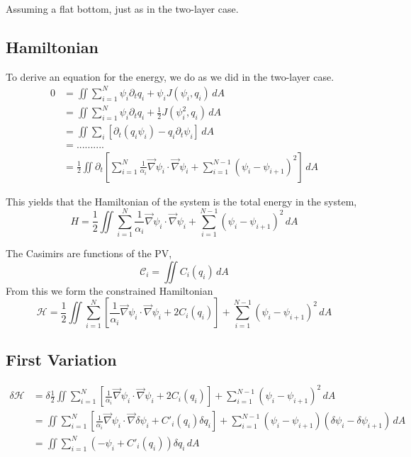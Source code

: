 \documentclass[12pt]{article}
\begin{document}
  Assuming a flat bottom, just as in the two-layer case.

  \subsection{Hamiltonian}

  To derive an equation for the energy, we do as we did in the two-layer case.
  \begin{align*}
    0 &= \iint \sum_{i=1}^N \psi_i \partial_t q_i + \psi_i J(\psi_i, q_i) \, dA \\
     &= \iint \sum_{i=1}^N \psi_i \partial_t q_i + \frac12 J(\psi_i^2, q_i) \, dA \\
     &= \iint \sum_i \left[\partial_t(q_i \psi_i) - q_i \partial_t\psi_i \right] \, dA \\
     &= .......... \\
     &= \frac12 \iint \partial_t \left[ \sum_{i=1}^N \frac{1}{\alpha_i} \vec\nabla \psi_i \cdot \vec\nabla \psi_i + \sum_{i=1}^{N-1} (\psi_i - \psi_{i+1})^2 \right]\, dA
  \end{align*}

  This yields that the Hamiltonian of the system is the total energy in the system,
  $$
  H = \frac12 \iint \sum_{i=1}^N \frac{1}{\alpha_i}\vec\nabla \psi_i \cdot \vec\nabla \psi_i + \sum_{i=1}^{N-1} (\psi_i - \psi_{i+1})^2 \, dA
  $$

  The Casimirs are functions of the PV,
  $$
  \mathcal{C}_i = \iint C_i(q_i) \, dA
  $$
  From this we form the constrained Hamiltonian
  \begin{equation}
    \mathcal{H} = \frac12 \iint \sum_{i=1}^N \left[ \frac{1}{\alpha_i} \vec\nabla \psi_i \cdot \vec\nabla \psi_i + 2C_i(q_i) \right] + \sum_{i=1}^{N-1} (\psi_i - \psi_{i+1})^2 \, dA
    \label{eqn:qg_Nl_h}
  \end{equation}

  \subsection{First Variation}
    \begin{align*}
      \delta \mathcal{H} &= \delta\frac12 \iint \sum_{i=1}^N \left[ \frac{1}{\alpha_i} \vec\nabla \psi_i \cdot \vec\nabla \psi_i + 2C_i(q_i) \right] + \sum_{i=1}^{N-1} (\psi_i - \psi_{i+1})^2 \, dA \\
       &= \iint \sum_{i=1}^N \left[ \frac{1}{\alpha_i} \vec\nabla \psi_i \cdot \vec\nabla \delta\psi_i + C'_i(q_i) \delta q_i \right]+ \sum_{i=1}^{N-1} (\psi_i - \psi_{i+1})(\delta \psi_i - \delta \psi_{i+1}) \, dA \\
       &= \iint \sum_{i=1}^N (-\psi_i + C'_i(q_i)) \delta q_i\, dA \\
    \end{align*}
\end{document}
